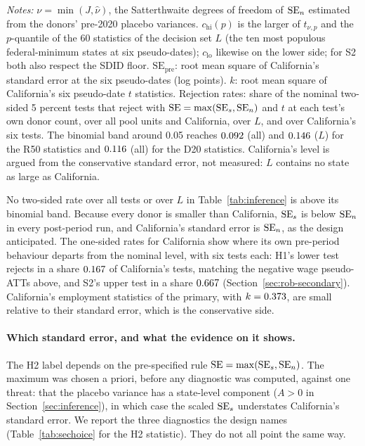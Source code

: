 \begin{table}[tbp]
\medskip
\begin{minipage}{\linewidth}\footnotesize
\emph{Notes:} $\nu = \min(J, \hat\nu)$, the Satterthwaite degrees of freedom of $\mathrm{SE}_{n}$ estimated
from the donors' pre-2020 placebo variances. $c_{\mathrm{hi}}(p)$ is the larger of $t_{\nu,p}$ and
the $p$-quantile of the 60 statistics of the decision set $L$ (the ten most populous
federal-minimum states at six pseudo-dates); $c_{\mathrm{lo}}$ likewise on the lower side; for S2
both also respect the SDID floor. $\mathrm{SE}_{\mathrm{pre}}$: root mean square of California's
standard error at the six pseudo-dates (log points). $k$: root mean square of California's six
pseudo-date $t$ statistics. Rejection rates: share of the nominal two-sided 5 percent tests that
reject with $\mathrm{SE} = \max(\mathrm{SE}_{s}, \mathrm{SE}_{n})$ and $t$ at each test's own donor count, over all
pool units and California, over $L$, and over California's six tests. The binomial band around
0.05 reaches $0.092$ (all) and $0.146$ ($L$) for the R50 statistics and
$0.116$ (all) for the D20 statistics. California's level is argued from the conservative
standard error, not measured: $L$ contains no state as large as California.
\end{minipage}
\end{table}

No two-sided rate over all tests or over $L$ in Table~\ref{tab:inference} is above its binomial
band. Because every donor is smaller than California, $\mathrm{SE}_{s}$ is below $\mathrm{SE}_{n}$ in every post-period
run, and California's standard error is $\mathrm{SE}_{n}$, as the design anticipated. The one-sided rates
for California show where its own pre-period behaviour departs from the nominal level, with six
tests each: H1's lower test rejects in a share $0.167$ of California's tests, matching
the negative wage pseudo-ATTs above, and S2's upper test in a share $0.667$
(Section~\ref{sec:rob-secondary}). California's employment statistics of the primary, with
$k = 0.373$, are small relative to their standard error, which is the conservative side.

\paragraph{Which standard error, and what the evidence on it shows.} The H2 label depends on the
pre-specified rule $\mathrm{SE} = \max(\mathrm{SE}_{s}, \mathrm{SE}_{n})$. The maximum was chosen a priori, before any
diagnostic was computed, against one threat: that the placebo variance has a state-level component
($A > 0$ in Section~\ref{sec:inference}), in which case the scaled $\mathrm{SE}_{s}$ understates California's
standard error. We report the three diagnostics the design names (Table~\ref{tab:sechoice} for the
H2 statistic). They do not all point the same way.


